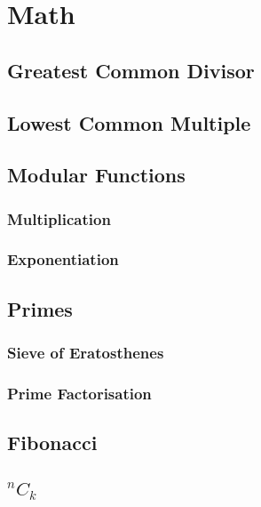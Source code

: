 \documentclass{article}
\begin{document}
\section{Math}
\subsection{Greatest Common Divisor}

\subsection{Lowest Common Multiple}


\subsection{Modular Functions}
\subsubsection{Multiplication}

\subsubsection{Exponentiation}


\subsection{Primes}
\subsubsection{Sieve of Eratosthenes}

\subsubsection{Prime Factorisation}


\subsection{Fibonacci}

\subsection{$^{n}C_{k}$}

\end{document}
